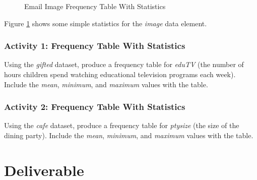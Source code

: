 \begin{figure}[H]
  \begin{center}
    \caption{Email Image Frequency Table With Statistics}
    \label{lab03_fig05}
  \end{center}
\end{figure}

Figure \ref{lab03_fig05} shows some simple statistics for the \textit{image} data element.

\subsubsection{Activity 1: Frequency Table With Statistics} \label{lab03_act01}

Using the \textit{gifted} dataset, produce a frequency table for \textit{eduTV} (the number of hours children spend watching educational television programs each week). Include the \textit{mean}, \textit{minimum}, and \textit{maximum} values with the table.

\subsubsection{Activity 2: Frequency Table With Statistics} \label{lab03_act02}

Using the \textit{cafe} dataset, produce a frequency table for \textit{ptysize} (the size of the dining party). Include the \textit{mean}, \textit{minimum}, and \textit{maximum} values with the table.

\section{Deliverable}

